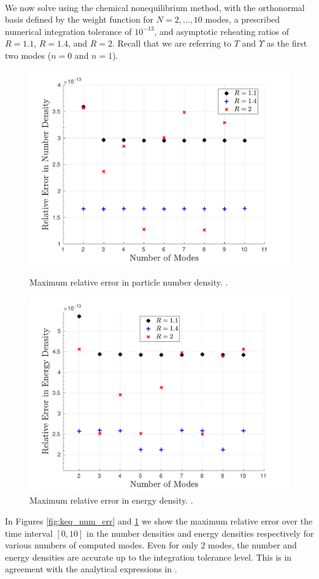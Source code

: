 \\
We now solve   using the chemical nonequilibrium method, with the orthonormal basis defined by the weight function  for $N=2,...,10$ modes, a prescribed numerical integration tolerance of $10^{-13}$, and asymptotic reheating ratios of $R=1.1$, $R=1.4$, and $R=2$.  Recall that we are referring to $T$ and $\Upsilon$ as the first two modes ($n=0$ and $n=1$). 
\begin{figure}[ht]
\centerline{\includegraphics[width=0.9\linewidth]{06-appendix/SpectralMethodBoltzmann/Figures/keq_num_err.pdf}}
\caption{Maximum relative error in particle number density. .}\label{fig:keq_num_err}
 \centerline{\includegraphics[width=0.9\linewidth]{06-appendix/SpectralMethodBoltzmann/Figures/keq_E_err.pdf}}
\caption{Maximum relative error in energy density. .}\label{fig:keq_E_err}
\end{figure}
In Figures \ref{fig:keq_num_err} and  \ref{fig:keq_E_err} we show the maximum relative error over the time interval $[0,10]$ in the number densities and energy densities respectively for various numbers of computed modes. Even for only $2$ modes, the number and energy densities are accurate up to the integration tolerance level.  This is in agreement with the analytical expressions in .



